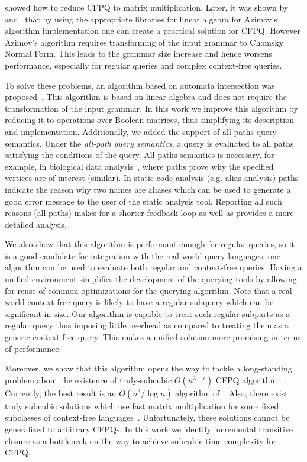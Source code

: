 \cite{Azimov:2018:CPQ:3210259.3210264} showed how to reduce CFPQ to matrix multiplication.
Later, it was shown by~\cite{Mishin:2019:ECP:3327964.3328503} and~\cite{10.1145/3398682.3399163} that by using the appropriate libraries for linear algebra for Azimov's algorithm implementation one can create a practical solution for CFPQ.
However Azimov's algorithm requires transforming of the input grammar to Chomsky Normal Form.
This leads to the grammar size increase and hence worsens performance, especially for regular queries and complex context-free queries.

To solve these problems, an algorithm based on automata intersection was proposed~\citep{10.1007/978-3-030-54832-2_6}.
This algorithm is based on linear algebra and does not require the transformation of the input grammar.
In this work we improve this algorithm by reducing it to operations over Boolean matrices, thus simplifying its description and implementation.
Additionally, we added the support of all-paths query semantics.
Under the \textit{all-path query semantics}, a query is evaluated to all paths satisfying the conditions of the query.
All-paths semantics is necessary, for example, in biological data analysis~\citep{GraphQueryWithEarley}, where paths prove why the specified vertices are of interest (similar).
In static code analysis (e.g. alias analysis) paths indicate the reason why two names are aliases which can be used to generate a good error message to the user of the static analysis tool. Reporting all such reasons (all paths) makes for a shorter feedback loop as well as provides a more detailed analysis.

We also show that this algorithm is performant enough for regular queries, so it is a good candidate for integration with the real-world query languages: one algorithm can be used to evaluate both regular and context-free queries.
Having a unified environment simplifies the development of the querying tools by allowing for reuse of common optimizations for the querying algorithm.
Note that a real-world context-free query is likely to have a regular subquery which can be significant in size.
Our algorithm is capable to treat such regular subparts as a regular query thus imposing little overhead as compared to treating them as a generic context-free query.
This makes a unified solution more promising in terms of performance.

Moreover, we show that this algorithm opens the way to tackle a long-standing problem about the existence of truly-subcubic $O(n^{3-\epsilon})$ CFPQ algorithm ~\citep{10.1145/1328438.1328460, Yannakakis}.
Currently, the best result is an $O(n^3/\log{n})$ algorithm of~\cite{10.1145/1328438.1328460}.
Also, there exist truly subcubic solutions which use fast matrix multiplication for some fixed subclasses of context-free languages~\citep{8249039}.
Unfortunately, these solutions cannot be generalized to arbitrary CFPQs.
In this work we identify incremental transitive closure as a bottleneck on the way to achieve subcubic time complexity for CFPQ.

